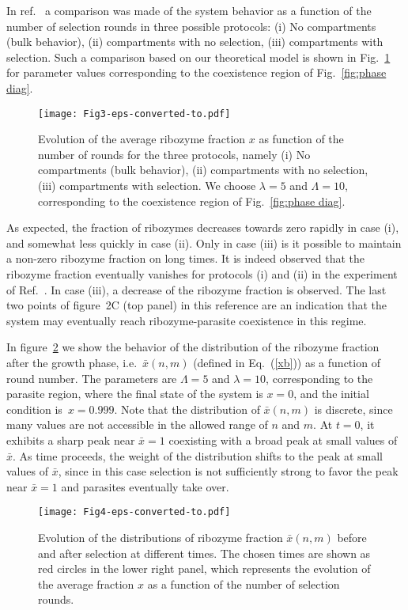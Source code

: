 \documentclass[twocolumn,showpacs,floatfix]{revtex4-1}
\newcommand{\xb}{{\bar x}}
\begin{document}
In ref.~\cite{Matsumura2016} a comparison was made
of the system behavior  as a function of the number of selection rounds in three possible protocols: 
(i) No compartments (bulk behavior), (ii) compartments with no selection, (iii) compartments with selection.
Such a comparison based on our theoretical model is shown in Fig.~\ref{fig:comparison} for parameter values corresponding 
to the coexistence region of Fig.~\ref{fig:phase diag}. 
\begin{figure}[htb]
\begin{center}
\texttt{[image: Fig3-eps-converted-to.pdf]}
\end{center}
\caption{Evolution of the average ribozyme fraction $x$ as function of the number of rounds for the three protocols, 
namely (i) No compartments (bulk behavior), (ii) compartments with no selection, (iii) compartments with selection. We choose  $\lambda=5$ and $\Lambda=10$, corresponding to the coexistence region of Fig.~\ref{fig:phase diag}.}
\label{fig:comparison}
\end{figure}
As expected, the fraction of ribozymes decreases towards zero rapidly 
in case (i), and somewhat less quickly in case (ii). Only in case (iii) is it possible to maintain  
a non-zero ribozyme fraction on long times.
It is indeed observed that the ribozyme fraction eventually vanishes for protocols (i) and (ii) in the experiment of Ref.~\cite{Matsumura2016}. In 
case (iii), a decrease of the ribozyme fraction is observed. The last two points of figure~2C (top panel) in this reference are an indication that the system may eventually reach ribozyme-parasite coexistence in this regime.

In figure~\ref{fig:totfig} we show the behavior of the 
distribution of the ribozyme fraction after the growth phase, i.e.\ $\xb(n,m)$
(defined in Eq.~(\ref{xb})) as a function of round number.
 The parameters are $\Lambda=5$ and $\lambda=10$, corresponding to 
the parasite region, where the final state of the system is $x=0$, and the initial condition is~$x=0.999$. 
Note that the distribution of $\xb(n,m)$ is discrete, since many values are not accessible in the allowed range of $n$ and $m$.
At $t=0$, it exhibits a sharp peak near $\xb=1$ coexisting with a broad peak at small values of $\xb$. 
As time proceeds, the weight of the distribution shifts to the peak at small values of $\xb$, since in this case selection 
is not sufficiently strong 
to favor the peak near $\xb=1$ and parasites eventually take over. 
\begin{figure}[htb]
\begin{center}
\texttt{[image: Fig4-eps-converted-to.pdf]}
\end{center}
\caption{Evolution of the distributions of ribozyme fraction $\xb(n,m)$ before and after selection at different times. 
The chosen times are shown as red circles in the lower right panel, which represents the evolution of the average fraction $x$
as a function of the number of selection rounds.}
\label{fig:totfig}
\end{figure}
\end{document}
